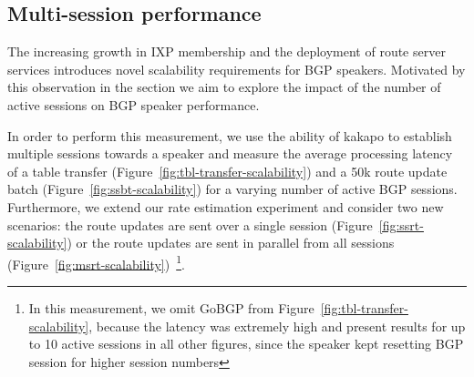 \subsection{Multi-session performance} \label{sec:multi-peer}

The increasing growth in IXP membership and the deployment of route server
services introduces novel scalability requirements for BGP speakers.
Motivated by this observation in the section we aim to explore the impact of
the number of active sessions on BGP speaker performance.

In order to perform this measurement, we use the ability of kakapo to establish
multiple sessions towards a speaker and measure the average processing latency
of a table transfer (Figure~\ref{fig:tbl-transfer-scalability}) and a 50k route
update batch (Figure~\ref{fig:ssbt-scalability}) for a varying number of active
BGP sessions.
Furthermore, we extend our rate estimation experiment and
consider two new scenarios: the route updates are sent over a single session
(Figure~\ref{fig:ssrt-scalability}) or the route updates are sent in parallel
from all sessions (Figure~\ref{fig:msrt-scalability})~\footnote{In this measurement, we omit GoBGP from Figure~\ref{fig:tbl-transfer-scalability}, because the latency was extremely high and present results for up to 10 active sessions in all other figures, since the speaker kept resetting BGP session for higher session numbers}.

